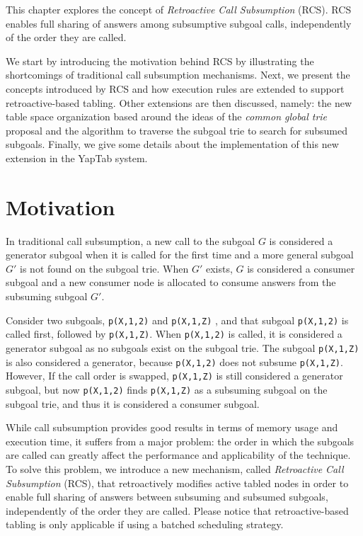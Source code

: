 This chapter explores the concept of \emph{Retroactive Call Subsumption} (RCS). RCS
enables full sharing of answers among subsumptive subgoal calls, independently of the order they are called.

We start by introducing the motivation behind RCS by illustrating the shortcomings of traditional call
subsumption mechanisms. Next, we present the concepts introduced by RCS and how execution
rules are extended to support retroactive-based tabling. Other extensions are then discussed, namely:
the new table space organization based around the ideas of the \textit{common global trie} proposal
\cite{CostaJ-08} and the algorithm to traverse the subgoal trie to search for subsumed subgoals. Finally, we
give some details about the implementation of this new extension in the YapTab system.

\section{Motivation}

In traditional call subsumption, a new call to the subgoal $G$ is considered a generator subgoal
when it is called for the first time and a more general subgoal $G'$ is not found on the subgoal trie.
When $G'$ exists, $G$ is considered a consumer subgoal and a new consumer node is allocated to consume
answers from the subsuming subgoal $G'$.

Consider two subgoals, \texttt{p(X,1,2)} and \texttt{p(X,1,Z)} , and that subgoal \texttt{p(X,1,2)} is called first,
followed by \texttt{p(X,1,Z)}. When \texttt{p(X,1,2)} is called, it is considered a generator subgoal as no subgoals
exist on the subgoal trie. The subgoal \texttt{p(X,1,Z)} is also considered a generator, because
\texttt{p(X,1,2)} does not subsume \texttt{p(X,1,Z)}. However, If the call order is swapped, \texttt{p(X,1,Z)} is still
considered a generator subgoal, but now \texttt{p(X,1,2)} finds \texttt{p(X,1,Z)} as a subsuming subgoal
on the subgoal trie, and thus it is considered a consumer subgoal.

While call subsumption provides good results in terms of memory usage and execution time, it suffers from a
major problem: the order in which the subgoals are called can greatly affect the performance
and applicability of the technique. To solve this problem, we introduce a new mechanism, called \textit{Retroactive Call
Subsumption} (RCS), that retroactively modifies active tabled nodes in order to enable full sharing
of answers between subsuming and subsumed subgoals, independently of the order they are called.
Please notice that retroactive-based tabling is only applicable if using a batched scheduling strategy.

